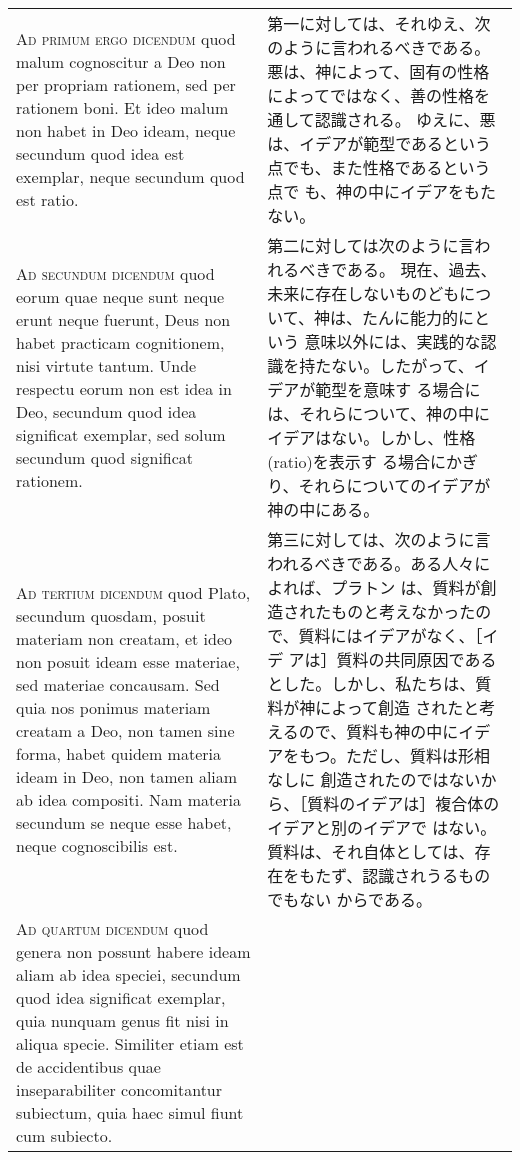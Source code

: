 \documentclass[10pt]{jsarticle} %
\begin{document}
\begin{longtable}{p{21em}p{21em}}
{\scshape Ad primum ergo dicendum} quod malum
cognoscitur a Deo non per propriam rationem, sed per rationem boni. Et
ideo malum non habet in Deo ideam, neque secundum quod idea est
exemplar, neque secundum quod est ratio.


&

第一に対しては、それゆえ、次のように言われるべきである。
悪は、神によって、固有の性格によってではなく、善の性格を通して認識される。
 ゆえに、悪は、イデアが範型であるという点でも、また性格であるという点で
 も、神の中にイデアをもたない。

\\


{\scshape Ad secundum dicendum} quod eorum quae neque
sunt neque erunt neque fuerunt, Deus non habet practicam cognitionem,
nisi virtute tantum. Unde respectu eorum non est idea in Deo, secundum
quod idea significat exemplar, sed solum secundum quod significat
rationem.

&

第二に対しては次のように言われるべきである。
現在、過去、未来に存在しないものどもについて、神は、たんに能力的にという
意味以外には、実践的な認識を持たない。したがって、イデアが範型を意味す
る場合には、それらについて、神の中にイデアはない。しかし、性格(ratio)を表示す
る場合にかぎり、それらについてのイデアが神の中にある。

\\


{\scshape Ad tertium dicendum} quod Plato, secundum
quosdam, posuit materiam non creatam, et ideo non posuit ideam esse
materiae, sed materiae concausam. Sed quia nos ponimus materiam creatam
a Deo, non tamen sine forma, habet quidem materia ideam in Deo, non
tamen aliam ab idea compositi. Nam materia secundum se neque esse habet,
neque cognoscibilis est.

&

第三に対しては、次のように言われるべきである。ある人々によれば、プラトン
 は、質料が創造されたものと考えなかったので、質料にはイデアがなく、［イデ
 アは］質料の共同原因であるとした。しかし、私たちは、質料が神によって創造
 されたと考えるので、質料も神の中にイデアをもつ。ただし、質料は形相なしに
 創造されたのではないから、［質料のイデアは］複合体のイデアと別のイデアで
 はない。質料は、それ自体としては、存在をもたず、認識されうるものでもない
 からである。

\\


{\scshape Ad quartum dicendum} quod genera non possunt
habere ideam aliam ab idea speciei, secundum quod idea significat
exemplar, quia nunquam genus fit nisi in aliqua specie. Similiter etiam
est de accidentibus quae inseparabiliter concomitantur subiectum, quia
haec simul fiunt cum subiecto. 



\end{longtable}
\end{document}

